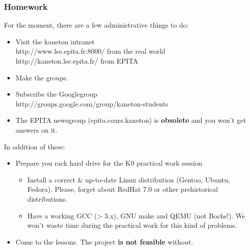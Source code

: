 \begin{frame}
  \frametitle{Homework}

  For the moment, there are a few administrative things to do:

  \begin{itemize}
  \item
    Visit the kaneton intranet\\
    http://www.lse.epita.fr:8000/ from the real world\\
    http://kaneton.lse.epita.fr/ from EPITA
  \item
    Make the groups.
  \item
    Subscribe the Googlegroup\\
    http://groups.google.com/group/kaneton-students
  \item
    The EPITA newsgroup (epita.cours.kaneton) is \textbf{obsolete} and
    you won't get answers on it.
  \end{itemize}

  \-

  In addition of these:

  \begin{itemize}
  \item
    Prepare you rack hard drive for the K0 practical work session
    \begin{itemize}
    \item
      Install a correct \& up-to-date Linux distribution (Gentoo, Ubuntu,
      Fedora). Please, forget about RedHat 7.0 or other prehistorical
      distributions.
    \item
      Have a working GCC (> 3.x), GNU make and QEMU (not Bochs!). We
      won't waste time during the practical work for this kind of
      problems.
    \end{itemize}
  \item
    Come to the lessons. The project \textbf{is not feasible} without.
  \end{itemize}

\end{frame}



